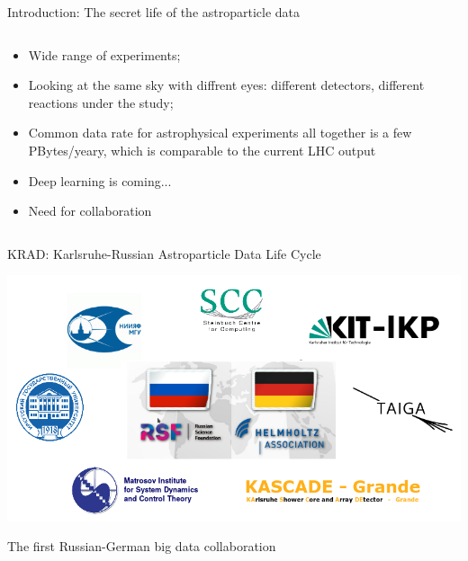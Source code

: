 \begin{frame}{Introduction: The secret life of the astroparticle data}
\begin{columns}
\begin{column}[t]{0.53\textwidth}
    \begin{itemize}
    \item Wide range of experiments;
    \item Looking at the same sky with diffrent eyes: different detectors, different reactions under the study;
    \item Common data rate for astrophysical experiments all together is a few PBytes/yeary, which is comparable to the current LHC output\footnotemark[1] %
    \item Deep learning is coming...
    \item Need for collaboration
    \end{itemize}

  \end{column}
\end{columns}
  \footnotesize{}
\end{frame}

\begin{frame}{\textcolor{kit-green100}{KRAD}: \textcolor{kit-green100}{K}arlsruhe-\textcolor{kit-green100}{R}ussian \textcolor{kit-green100}{A}stroparticle \textcolor{kit-green100}{D}ata Life Cycle}
\vspace{-2em}
\begin{center}
  \includegraphics[width=1\linewidth]{pics/Collab.png}
\end{center}
\vspace{-2\parsep}
The first Russian-German big data collaboration
\end{frame}

